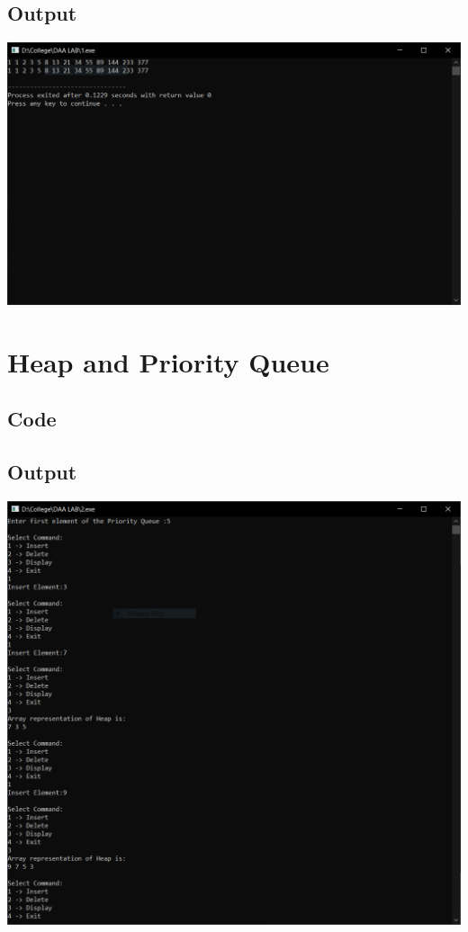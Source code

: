 \documentclass[11pt]{article}
\begin{document}
	\subsection{Output}
		\includegraphics[scale=0.7]{pic/1.png}
\newpage









\section{Heap and Priority Queue}
	\subsection{Code}
		
	\subsection{Output}
		\includegraphics[scale=0.7]{pic/2.png}
\newpage
\end{document}
